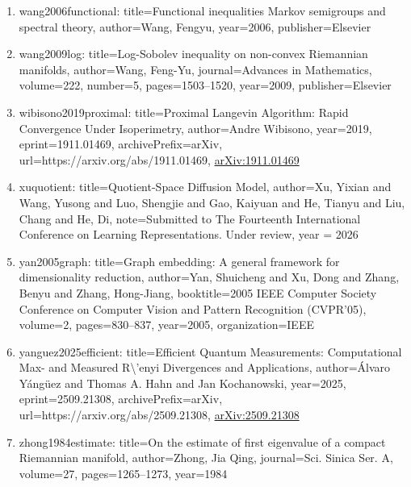 \documentclass[11pt]{article}
\begin{document}
\begin{enumerate}[leftmargin=*]
  \item wang2006functional: title=Functional inequalities Markov semigroups and spectral theory, author=Wang, Fengyu, year=2006, publisher=Elsevier
  \item wang2009log: title=Log-Sobolev inequality on non-convex Riemannian manifolds, author=Wang, Feng-Yu, journal=Advances in Mathematics, volume=222, number=5, pages=1503--1520, year=2009, publisher=Elsevier
  \item wibisono2019proximal: title=Proximal Langevin Algorithm: Rapid Convergence Under Isoperimetry, author=Andre Wibisono, year=2019, eprint=1911.01469, archivePrefix=arXiv, url=https://arxiv.org/abs/1911.01469, \href{https://arxiv.org/abs/1911.01469}{arXiv:1911.01469}
  \item xuquotient: title=Quotient-Space Diffusion Model, author=Xu, Yixian and Wang, Yusong and Luo, Shengjie and Gao, Kaiyuan and He, Tianyu and Liu, Chang and He, Di, note=Submitted to The Fourteenth International Conference on Learning Representations. Under review, year = 2026
  \item yan2005graph: title=Graph embedding: A general framework for dimensionality reduction, author=Yan, Shuicheng and Xu, Dong and Zhang, Benyu and Zhang, Hong-Jiang, booktitle=2005 IEEE Computer Society Conference on Computer Vision and Pattern Recognition (CVPR'05), volume=2, pages=830--837, year=2005, organization=IEEE
  \item yanguez2025efficient: title=Efficient Quantum Measurements: Computational Max- and Measured R\textbackslash{}'enyi Divergences and Applications, author=Álvaro Yángüez and Thomas A. Hahn and Jan Kochanowski, year=2025, eprint=2509.21308, archivePrefix=arXiv, url=https://arxiv.org/abs/2509.21308, \href{https://arxiv.org/abs/2509.21308}{arXiv:2509.21308}
  \item zhong1984estimate: title=On the estimate of first eigenvalue of a compact Riemannian manifold, author=Zhong, Jia Qing, journal=Sci. Sinica Ser. A, volume=27, pages=1265--1273, year=1984
\end{enumerate}

% 
% 
\end{document}
